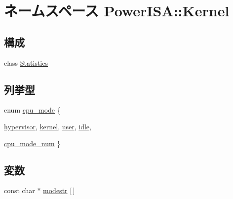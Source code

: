 \hypertarget{namespacePowerISA_1_1Kernel}{
\section{ネームスペース PowerISA::Kernel}
\label{namespacePowerISA_1_1Kernel}
}
\subsection*{構成}
\begin{DoxyCompactItemize}
\item 
class \hyperlink{classPowerISA_1_1Kernel_1_1Statistics}{Statistics}
\end{DoxyCompactItemize}
\subsection*{列挙型}
\begin{DoxyCompactItemize}
\item 
enum \hyperlink{namespacePowerISA_1_1Kernel_aa1fc3805dac6f71f457fbbc263105bf6}{cpu\_\-mode} \{ \par
\hyperlink{namespacePowerISA_1_1Kernel_aa1fc3805dac6f71f457fbbc263105bf6a91b640fcbd5e0f6c8310b554caa00d4b}{hypervisor}, 
\hyperlink{namespacePowerISA_1_1Kernel_aa1fc3805dac6f71f457fbbc263105bf6adb0339d028e596254368234e5ab09f9d}{kernel}, 
\hyperlink{namespacePowerISA_1_1Kernel_aa1fc3805dac6f71f457fbbc263105bf6a04981b8c09a50ccfb1d92fc11b81c36a}{user}, 
\hyperlink{namespacePowerISA_1_1Kernel_aa1fc3805dac6f71f457fbbc263105bf6a0e9a37114c0e458d28d52f06ec0f2242}{idle}, 
\par
\hyperlink{namespacePowerISA_1_1Kernel_aa1fc3805dac6f71f457fbbc263105bf6a4572f7cf10830e04921c8896f22102ba}{cpu\_\-mode\_\-num}
 \}
\end{DoxyCompactItemize}
\subsection*{変数}
\begin{DoxyCompactItemize}
\item 
const char $\ast$ \hyperlink{namespacePowerISA_1_1Kernel_aaab5092bc6d1c40a90ff4c7450649ace}{modestr} \mbox{[}$\,$\mbox{]}
\end{DoxyCompactItemize}


